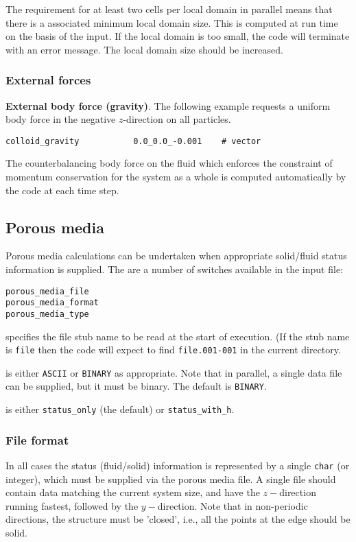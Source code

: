 The requirement for at least two cells per local domain in parallel
means that there is a associated minimum local domain size. This is
computed at run time on the basis of the input. If the local domain
is too small, the code will terminate with an error message. The
local domain size should be increased.


\subsubsection{External forces}

{\bf External body force (gravity)}.
The following example requests a uniform body force in the negative
$z$-direction on all particles.
\begin{lstlisting}
colloid_gravity           0.0_0.0_-0.001    # vector
\end{lstlisting}
The counterbalancing body force on the fluid which enforces the
constraint of momentum conservation for the system as a whole is
computed automatically by the code at each time step.


\subsection{Porous media}

Porous media calculations can be undertaken when appropriate
solid/fluid status information is supplied. The are a number
of switches available in the input file:
\begin{lstlisting}
porous_media_file
porous_media_format
porous_media_type
\end{lstlisting}

specifies the file stub name to be read at the start of execution.
(If the stub name is \texttt{file} then the code will expect to
find \texttt{file.001-001} in the current directory.

is either \texttt{ASCII} or \texttt{BINARY} as appropriate. Note that
in parallel, a single data file can be supplied, but it must be binary.
The default is \texttt{BINARY}.

is either \texttt{status\_only} (the default) or \texttt{status\_with\_h}.

\subsubsection{File format}

In all cases the status (fluid/solid) information is represented by a
single \texttt{char} (or integer), which must be supplied via the
porous media file. A single file should contain data matching the
current system size, and have the $z-$direction running fastest,
followed by the $y-$direction. Note that in non-periodic directions,
the structure must be 'closed', i.e., all the points at the edge
should be solid.

